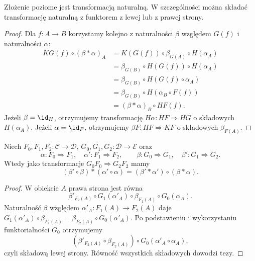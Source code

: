 \begin{stwierdzenie}\label{cat:prop:horizontal}
Złożenie poziome jest transformacją naturalną. W szczególności można składać transformację naturalną z funktorem z lewej lub z prawej strony.
\end{stwierdzenie}
\begin{proof}
Dla $f:A\to B$ korzystamy kolejno z naturalności $\beta$ względem $G(f)$ i naturalności $\alpha$:
\begin{align*}
KG(f)\circ(\beta\ast\alpha)_A
&=K(G(f))\circ\beta_{G(A)}\circ H(\alpha_A)\\
&=\beta_{G(B)}\circ H(G(f))\circ H(\alpha_A)\\
&=\beta_{G(B)}\circ H(G(f)\circ\alpha_A)\\
&=\beta_{G(B)}\circ H(\alpha_B\circ F(f))\\
&=(\beta\ast\alpha)_B\circ HF(f).
\end{align*}
Jeżeli $\beta=\id_H$, otrzymujemy transformację $H\alpha:HF\Rightarrow HG$ o składowych $H(\alpha_A)$. Jeżeli $\alpha=\id_F$, otrzymujemy $\beta F:HF\Rightarrow KF$ o składowych $\beta_{F(A)}$.
\end{proof}

\begin{twierdzenie}\label{cat:thm:interchange}
Niech $F_0,F_1,F_2:\mathcal C\to\mathcal D$, $G_0,G_1,G_2:\mathcal D\to\mathcal E$ oraz
\[
\alpha:F_0\Rightarrow F_1,\quad \alpha':F_1\Rightarrow F_2,
\qquad
\beta:G_0\Rightarrow G_1,\quad \beta':G_1\Rightarrow G_2.
\]
Wtedy jako transformacje $G_0F_0\Rightarrow G_2F_2$ mamy
\[
(\beta'\circ\beta)\ast(\alpha'\circ\alpha)
=(\beta'\ast\alpha')\circ(\beta\ast\alpha).
\]
\end{twierdzenie}
\begin{proof}
W obiekcie $A$ prawa strona jest równa
\[
\beta'_{F_2(A)}\circ G_1(\alpha'_A)\circ
\beta_{F_1(A)}\circ G_0(\alpha_A).
\]
Naturalność $\beta$ względem $\alpha'_A:F_1(A)\to F_2(A)$ daje
$G_1(\alpha'_A)\circ\beta_{F_1(A)}
=\beta_{F_2(A)}\circ G_0(\alpha'_A)$.
Po podstawieniu i wykorzystaniu funktorialności $G_0$ otrzymujemy
\[
(\beta'_{F_2(A)}\circ\beta_{F_2(A)})\circ
G_0(\alpha'_A\circ\alpha_A),
\]
czyli składową lewej strony. Równość wszystkich składowych dowodzi tezy.
\end{proof}


